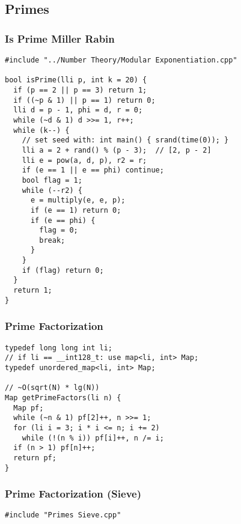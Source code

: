 \documentclass[twoside]{article}
\begin{document}
\begin{multicols*}{2}
\subsection*{Primes}
\vspace{2em}
\subsubsectionfont{\large\bfseries\sffamily\underline}
\subsubsection*{Is Prime Miller Rabin}
\begin{verbatim}
#include "../Number Theory/Modular Exponentiation.cpp"

bool isPrime(lli p, int k = 20) {
  if (p == 2 || p == 3) return 1;
  if ((~p & 1) || p == 1) return 0;
  lli d = p - 1, phi = d, r = 0;
  while (~d & 1) d >>= 1, r++;
  while (k--) {
    // set seed with: int main() { srand(time(0)); }
    lli a = 2 + rand() % (p - 3);  // [2, p - 2]
    lli e = pow(a, d, p), r2 = r;
    if (e == 1 || e == phi) continue;
    bool flag = 1;
    while (--r2) {
      e = multiply(e, e, p);
      if (e == 1) return 0;
      if (e == phi) {
        flag = 0;
        break;
      }
    }
    if (flag) return 0;
  }
  return 1;
}
\end{verbatim}

\subsubsectionfont{\large\bfseries\sffamily\underline}
\subsubsection*{Prime Factorization}
\begin{verbatim}
typedef long long int li;
// if li == __int128_t: use map<li, int> Map;
typedef unordered_map<li, int> Map;

// ~O(sqrt(N) * lg(N))
Map getPrimeFactors(li n) {
  Map pf;
  while (~n & 1) pf[2]++, n >>= 1;
  for (li i = 3; i * i <= n; i += 2)
    while (!(n % i)) pf[i]++, n /= i;
  if (n > 1) pf[n]++;
  return pf;
}
\end{verbatim}

\subsubsectionfont{\large\bfseries\sffamily\underline}
\subsubsection*{Prime Factorization (Sieve)}
\begin{verbatim}
#include "Primes Sieve.cpp"


\end{verbatim}
\end{multicols*}
\end{document}
